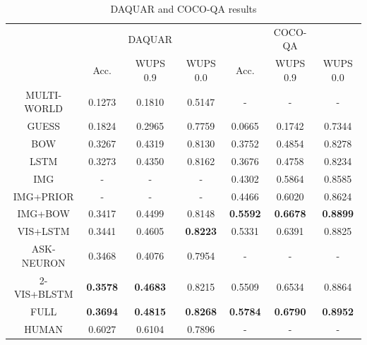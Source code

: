 \documentclass{article} %
\renewcommand{\#}[1]{\textbf{#1}}
\begin{document}
\begin{table}[h]
\caption{DAQUAR and COCO-QA results}
\label{tab:daquar_results}
\begin{center}
\begin{small}
\begin{sc}
\begin{tabular}{c | c c c | c c c}
\hline     
                     &          &  DAQUAR  &          &          &  COCO-QA &          \\
                     & Acc.     & WUPS 0.9 & WUPS 0.0 & Acc.     & WUPS 0.9 & WUPS 0.0 \\
\hline         
MULTI-WORLD
\cite{malinowski14b} &  0.1273  &  0.1810  &  0.5147  &  -       &  -       &  -       \\
GUESS                &  0.1824  &  0.2965  &  0.7759  &  0.0665  &  0.1742  &  0.7344  \\
BOW                  &  0.3267  &  0.4319  &  0.8130  &  0.3752  &  0.4854  &  0.8278  \\
LSTM                 &  0.3273  &  0.4350  &  0.8162  &  0.3676  &  0.4758  &  0.8234  \\
IMG                  &  -       &  -       &  -       &  0.4302  &  0.5864  &  0.8585  \\
IMG+PRIOR            &  -       &  -       &  -       &  0.4466  &  0.6020  &  0.8624  \\
IMG+BOW              &  0.3417  &  0.4499  &  0.8148  &\#{0.5592}&\#{0.6678}&\#{0.8899}\\
VIS+LSTM             &  0.3441  &  0.4605  &\#{0.8223}&  0.5331  &  0.6391  & 0.8825   \\
ASK-NEURON
\cite{malinowski15}  &  0.3468  &  0.4076  & 0.7954   &  -       &  -       &  -       \\
2-VIS+BLSTM          &\#{0.3578}&\#{0.4683}& 0.8215   &  0.5509  &  0.6534  & 0.8864   \\
FULL                 &\#{0.3694}&\#{0.4815}&\#{0.8268}&\#{0.5784}&\#{0.6790}&\#{0.8952}\\
\hline
HUMAN                &  0.6027  &  0.6104  &  0.7896  &  -       &  -       &  -       \\
\hline
\end{tabular}
\end{sc}
\end{small}
\end{center}
\end{table}
\end{document}
